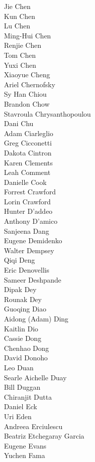 Jie Chen\\
Kun Chen\\
Lu Chen\\
Ming-Hui Chen\\
Renjie Chen\\
Tom Chen\\
Yuxi Chen\\
Xiaoyue Cheng\\
Ariel Chernofsky\\
Sy Han Chiou\\
Brandon Chow\\
Stavroula Chrysanthopoulou\\
Dani Chu\\
Adam Ciarleglio\\
Greg Cicconetti\\
Dakota Cintron\\
Karen Clements\\
Leah Comment\\
Danielle Cook\\
Forrest Crawford\\
Lorin Crawford\\
Hunter D'addeo\\
Anthony D'amico\\
Sanjeena Dang\\
Eugene Demidenko\\
Walter Dempsey\\
Qiqi Deng\\
Eric Denovellis\\
Sameer Deshpande\\
Dipak Dey\\
Rounak Dey\\
Guoqing Diao\\
Aidong (Adam) Ding\\
Kaitlin Dio\\
Cassie Dong\\
Chenhao Dong\\
David Donoho\\
Leo Duan\\
Searle Aichelle Duay\\
Bill Duggan\\
Chiranjit Dutta\\
Daniel Eck\\
Uri Eden\\
Andreea Erciulescu\\
Beatriz Etchegaray Garcia\\
Eugene Evans\\
Yuchen Fama\\
